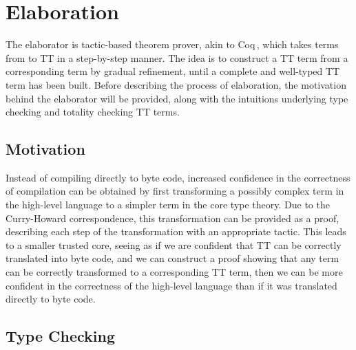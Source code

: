 \section{Elaboration}
\label{sec:elaboration}
The elaborator is tactic-based theorem prover, akin to Coq\,\citep{Coq:manual},
which takes terms from \IdrisM{} to TT in a step-by-step manner. The idea is to
construct a TT term from a corresponding \IdrisM{} term by gradual refinement,
until a complete and well-typed TT term has been built. Before describing the
process of elaboration, the motivation behind the elaborator will be provided,
along with the intuitions underlying type checking and totality checking TT terms. 

\subsection{Motivation}
Instead of compiling \IdrisM{} directly to byte code, increased confidence in
the correctness of compilation can be obtained by first transforming a possibly
complex term in the high-level language to a simpler term in the core type
theory. Due to the Curry-Howard correspondence, this transformation can be
provided as a proof, describing each step of the transformation with an
appropriate tactic. This leads to a smaller trusted core, seeing as if we are
confident that TT can be correctly translated into byte code, and we can
construct a proof showing that any \IdrisM{} term can be correctly transformed
to a corresponding TT term, then we can be more confident in the correctness of
the high-level \IdrisM{} language than if it was translated directly to byte
code.

\subsection{Type Checking}
\label{sec:type-checking}


